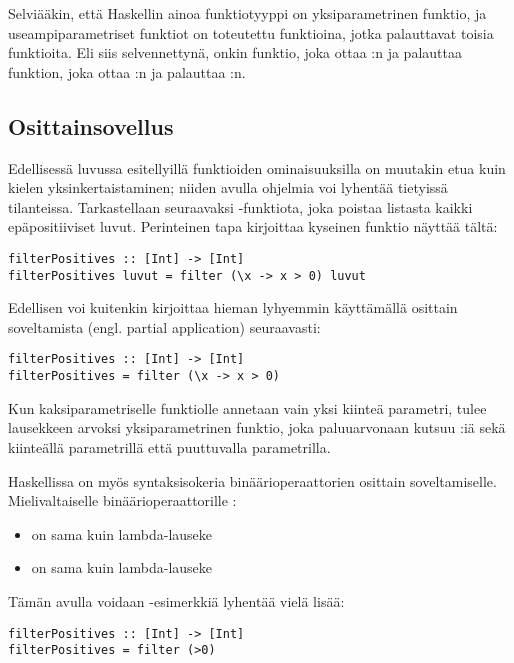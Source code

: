Selviääkin, että Haskellin ainoa funktiotyyppi on yksiparametrinen funktio,
ja useampiparametriset funktiot on toteutettu funktioina, jotka palauttavat toisia funktioita.
Eli siis selvennettynä,
 onkin funktio, joka ottaa :n ja palauttaa funktion,
joka ottaa :n ja palauttaa :n.

\subsection{Osittainsovellus}
Edellisessä luvussa esitellyillä funktioiden ominaisuuksilla on muutakin etua
kuin kielen yksinkertaistaminen; niiden avulla ohjelmia voi lyhentää tietyissä tilanteissa.
Tarkastellaan seuraavaksi -funktiota, joka poistaa listasta kaikki
epäpositiiviset luvut.
Perinteinen tapa kirjoittaa kyseinen funktio näyttää tältä:

\begin{verbatim}
filterPositives :: [Int] -> [Int]
filterPositives luvut = filter (\x -> x > 0) luvut
\end{verbatim}

Edellisen voi kuitenkin kirjoittaa hieman lyhyemmin käyttämällä osittain soveltamista
(engl. partial application) seuraavasti:

\begin{verbatim}
filterPositives :: [Int] -> [Int]
filterPositives = filter (\x -> x > 0)
\end{verbatim}

Kun kaksiparametriselle funktiolle  annetaan vain yksi kiinteä parametri,
tulee lausekkeen arvoksi yksiparametrinen funktio,
joka paluuarvonaan kutsuu :iä sekä kiinteällä parametrillä että puuttuvalla parametrilla.

Haskellissa on myös syntaksisokeria binäärioperaattorien osittain soveltamiselle.
Mielivaltaiselle binäärioperaattorille :
\begin{itemize}
    \item {} on sama kuin lambda-lauseke 
    \item {} on sama kuin lambda-lauseke 
\end{itemize}

Tämän avulla voidaan -esimerkkiä lyhentää vielä lisää:
\begin{verbatim}
filterPositives :: [Int] -> [Int]
filterPositives = filter (>0)
\end{verbatim}
\fi

